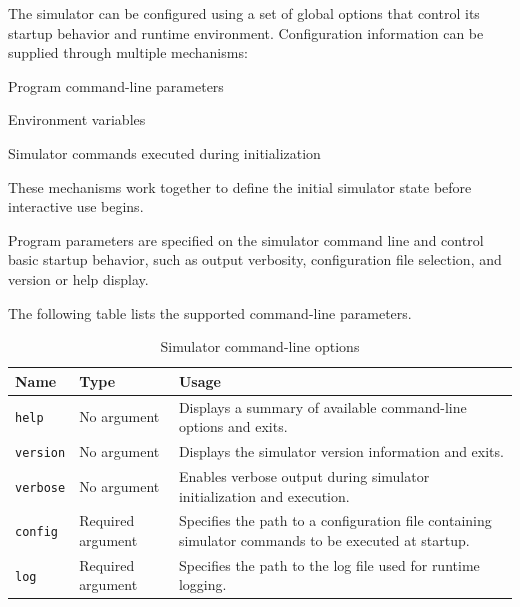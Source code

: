 
The simulator can be configured using a set of global options that control its
startup behavior and runtime environment. Configuration information can be supplied through multiple mechanisms:

\begin{smallGapItemize}
    \item Program command-line parameters
    \item Environment variables
    \item Simulator commands executed during initialization
\end{smallGapItemize}

These mechanisms work together to define the initial simulator state before
interactive use begins.


Program parameters are specified on the simulator command line and control
basic startup behavior, such as output verbosity, configuration file selection,
and version or help display.

The following table lists the supported command-line parameters.

\begin{table}[h]
\centering
\begin{tabularx}{\linewidth}{|l|l|X|}
\hline
\textbf{Name} & \textbf{Type} & \textbf{Usage} \\ \hline
\texttt{help} &
No argument &
Displays a summary of available command-line options and exits. \\ \hline

\texttt{version} &
No argument &
Displays the simulator version information and exits. \\ \hline

\texttt{verbose} &
No argument &
Enables verbose output during simulator initialization and execution. \\ \hline

\texttt{config} &
Required argument &
Specifies the path to a configuration file containing simulator commands to be
executed at startup. \\ \hline

\texttt{log} &
Required argument &
Specifies the path to the log file used for runtime logging. \\ \hline
\end{tabularx}
\caption{Simulator command-line options}
\end{table}

